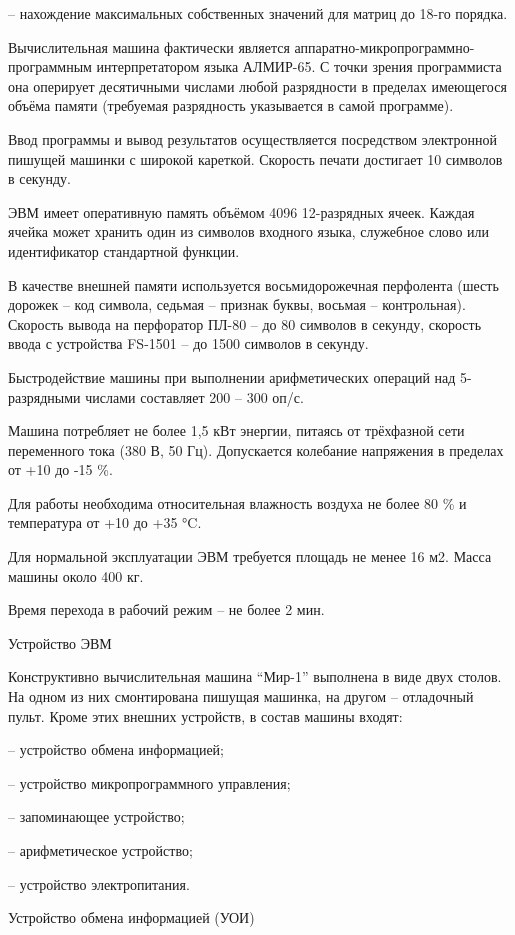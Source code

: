 \documentclass[11pt]{article}
\begin{document}
– нахождение максимальных собственных
значений для матриц до 18-го порядка.

Вычислительная машина фактически
является
аппаратно-микропрограммно-программным
интерпретатором языка АЛМИР-65. С точки
зрения программиста она оперирует
десятичными числами любой разрядности
в пределах имеющегося объёма памяти
(требуемая разрядность указывается в
самой программе).

Ввод программы и вывод результатов
осуществляется посредством
электронной пишущей машинки с широкой
кареткой. Скорость печати достигает 10
символов в секунду.

ЭВМ имеет оперативную память объёмом
4096 12-разрядных ячеек. Каждая ячейка
может хранить один из символов
входного языка, служебное слово или
идентификатор стандартной функции.

В качестве внешней памяти используется
восьмидорожечная перфолента (шесть
дорожек – код символа, седьмая –
признак буквы, восьмая – контрольная).
Скорость вывода на перфоратор ПЛ-80 – до
80 символов в секунду, скорость ввода с
устройства FS-1501 – до 1500 символов в
секунду.

Быстродействие машины при выполнении
арифметических операций над
5-разрядными числами составляет 200 – 300
оп/с.

Машина потребляет не более 1,5 кВт
энергии, питаясь от трёхфазной сети
переменного тока (380 В, 50 Гц).
Допускается колебание напряжения в
пределах от +10 до -15 \%.

Для работы необходима относительная
влажность воздуха не более 80 \% и
температура от +10 до +35 °C.

Для нормальной эксплуатации ЭВМ
требуется площадь не менее 16 м2. Масса
машины около 400 кг.

Время перехода в рабочий режим – не
более 2 мин.

Устройство ЭВМ

Конструктивно вычислительная машина
“Мир-1” выполнена в виде двух столов.
На одном из них смонтирована пишущая
машинка, на другом – отладочный пульт.
Кроме этих внешних устройств, в состав
машины входят:

– устройство обмена информацией;

– устройство микропрограммного
управления;

– запоминающее устройство;

– арифметическое устройство;

– устройство электропитания.

Устройство обмена информацией (УОИ)
\end{document}
